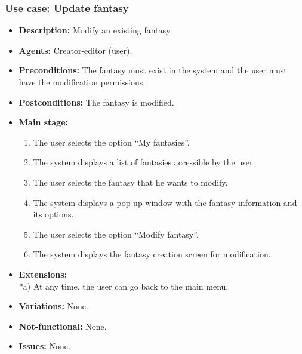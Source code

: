 \subsubsection{Use case: Update fantasy}
\begin{itemize}
	\item \textbf{Description:} Modify an existing fantasy.
	\item \textbf{Agents:} Creator-editor (user).
	\item \textbf{Preconditions:} The fantasy must exist in the system and the user must have the modification permissions.
	\item \textbf{Postconditions:} The fantasy is modified.
	\item \textbf{Main stage:}
	\begin{enumerate}
		\item The user selects the option ``My fantasies''.
		\item The system displays a list of fantasies accessible by the user.
		\item The user selects the fantasy that he wants to modify.
		\item The system displays a pop-up window with the fantasy information and its options.
		\item The user selects the option ``Modify fantasy''.
		\item The system displays the fantasy creation screen for modification.
	\end{enumerate}
	\item \textbf{Extensions:} \\ *a) At any time, the user can go back to the main menu.
	\item \textbf{Variations:} None.
	\item \textbf{Not-functional:} None.
	\item \textbf{Issues:} None.
\end{itemize}

